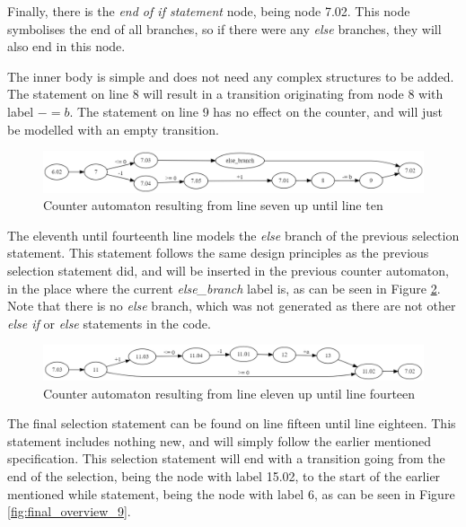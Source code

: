 \documentclass[12pt]{article}
\begin{document}
Finally, there is the \textit{end of if statement} node, being node 7.02. This node symbolises the end of all branches, so if there were any \textit{else} branches, they will also end in this node.

The inner body is simple and does not need any complex structures to be added. The statement on line 8 will result in a transition originating from node 8 with label $-= b$. The statement on line 9 has no effect on the counter, and will just be modelled with an empty transition.

\begin{figure}[h]
	\centering
	\includegraphics[width=\linewidth]{final_overview_7}
	\caption{Counter automaton resulting from line seven up until line ten}
	\label{fig:final_overview_7}
\end{figure}

The eleventh until fourteenth line models the \textit{else} branch of the previous selection statement. This statement follows the same design principles as the previous selection statement did, and will be inserted in the previous counter automaton, in the place where the current \textit{else\_branch} label is, as can be seen in Figure \ref{fig:final_overview_8}. Note that there is no \textit{else} branch, which was not generated as there are not other \textit{else if} or \textit{else} statements in the code.

\begin{figure}[h]
	\centering
	\includegraphics[width=\linewidth]{final_overview_8}
	\caption{Counter automaton resulting from line eleven up until line fourteen}
	\label{fig:final_overview_8}
\end{figure}

The final selection statement can be found on line fifteen until line eighteen. This statement includes nothing new, and will simply follow the earlier mentioned specification. This selection statement will end with a transition going from the end of the selection, being the node with label 15.02, to the start of the earlier mentioned while statement, being the node with label 6, as can be seen in Figure \ref{fig:final_overview_9}.
\end{document}
